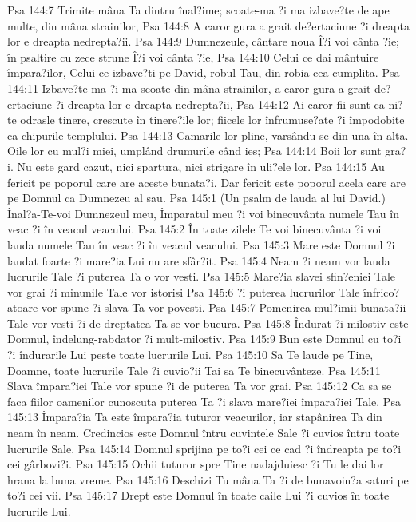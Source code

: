 Psa 144:7  Trimite mâna Ta dintru înal?ime; scoate-ma ?i ma izbave?te de ape multe, din mâna strainilor,
Psa 144:8  A caror gura a grait de?ertaciune ?i dreapta lor e dreapta nedrepta?ii.
Psa 144:9  Dumnezeule, cântare noua Î?i voi cânta ?ie; în psaltire cu zece strune Î?i voi cânta ?ie,
Psa 144:10  Celui ce dai mântuire împara?ilor, Celui ce izbave?ti pe David, robul Tau, din robia cea cumplita.
Psa 144:11  Izbave?te-ma ?i ma scoate din mâna strainilor, a caror gura a grait de?ertaciune ?i dreapta lor e dreapta nedrepta?ii,
Psa 144:12  Ai caror fii sunt ca ni?te odrasle tinere, crescute în tinere?ile lor; fiicele lor înfrumuse?ate ?i împodobite ca chipurile templului.
Psa 144:13  Camarile lor pline, varsându-se din una în alta. Oile lor cu mul?i miei, umplând drumurile când ies;
Psa 144:14  Boii lor sunt gra?i. Nu este gard cazut, nici spartura, nici strigare în uli?ele lor.
Psa 144:15  Au fericit pe poporul care are aceste bunata?i. Dar fericit este poporul acela care are pe Domnul ca Dumnezeu al sau.
Psa 145:1  (Un psalm de lauda al lui David.) Înal?a-Te-voi Dumnezeul meu, Împaratul meu ?i voi binecuvânta numele Tau în veac ?i în veacul veacului.
Psa 145:2  În toate zilele Te voi binecuvânta ?i voi lauda numele Tau în veac ?i în veacul veacului.
Psa 145:3  Mare este Domnul ?i laudat foarte ?i mare?ia Lui nu are sfâr?it.
Psa 145:4  Neam ?i neam vor lauda lucrurile Tale ?i puterea Ta o vor vesti.
Psa 145:5  Mare?ia slavei sfin?eniei Tale vor grai ?i minunile Tale vor istorisi
Psa 145:6  ?i puterea lucrurilor Tale înfrico?atoare vor spune ?i slava Ta vor povesti.
Psa 145:7  Pomenirea mul?imii bunata?ii Tale vor vesti ?i de dreptatea Ta se vor bucura.
Psa 145:8  Îndurat ?i milostiv este Domnul, îndelung-rabdator ?i mult-milostiv.
Psa 145:9  Bun este Domnul cu to?i ?i îndurarile Lui peste toate lucrurile Lui.
Psa 145:10  Sa Te laude pe Tine, Doamne, toate lucrurile Tale ?i cuvio?ii Tai sa Te binecuvânteze.
Psa 145:11  Slava împara?iei Tale vor spune ?i de puterea Ta vor grai.
Psa 145:12  Ca sa se faca fiilor oamenilor cunoscuta puterea Ta ?i slava mare?iei împara?iei Tale.
Psa 145:13  Împara?ia Ta este împara?ia tuturor veacurilor, iar stapânirea Ta din neam în neam. Credincios este Domnul întru cuvintele Sale ?i cuvios întru toate lucrurile Sale.
Psa 145:14  Domnul sprijina pe to?i cei ce cad ?i îndreapta pe to?i cei gârbovi?i.
Psa 145:15  Ochii tuturor spre Tine nadajduiesc ?i Tu le dai lor hrana la buna vreme.
Psa 145:16  Deschizi Tu mâna Ta ?i de bunavoin?a saturi pe to?i cei vii.
Psa 145:17  Drept este Domnul în toate caile Lui ?i cuvios în toate lucrurile Lui.
